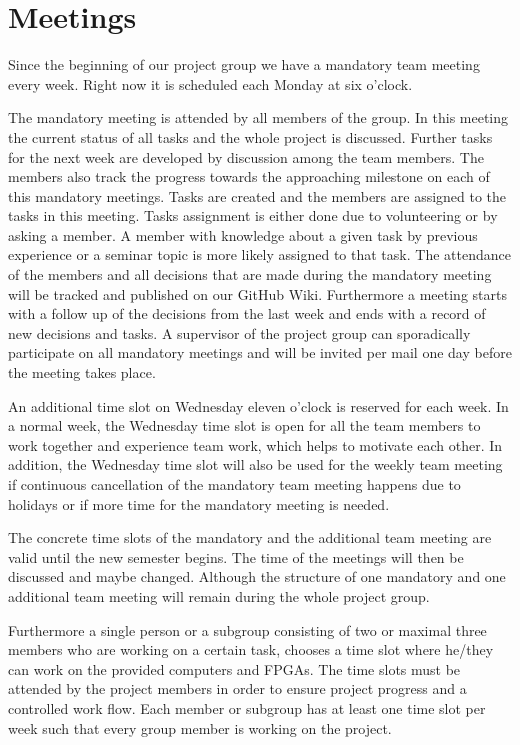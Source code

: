 \section{Meetings}
Since the beginning of our project group we have a mandatory team meeting every week.
Right now it is scheduled each Monday at six o'clock.

The mandatory meeting is attended by all members of the group.
In this meeting the current status of all tasks and the whole project is discussed.
Further tasks for the next week are developed by discussion among the team members.
The members also track the progress towards the approaching milestone on each of this mandatory meetings.
Tasks are created and the members are assigned to the tasks in this meeting. Tasks assignment is either done due to volunteering or by asking a member.
A member with knowledge about a given task by previous experience or a seminar topic is more likely assigned to that task.
The attendance of the members and all decisions that are made during the mandatory meeting will be tracked and published on our GitHub Wiki. Furthermore a meeting starts with a follow up of the decisions from the last week and ends with a record of new decisions and tasks.
A supervisor of the project group can sporadically participate on all mandatory meetings and will be invited per mail one day before the meeting takes place. 

An additional time slot on Wednesday eleven o'clock is reserved for each week.
In a normal week, the Wednesday time slot is open for all the team members to work together and experience team work, which helps to motivate each other.
In addition, the Wednesday time slot will also be used for the weekly team meeting if continuous cancellation of the mandatory team meeting happens due to holidays
or if more time for the mandatory meeting is needed.

The concrete time slots of the mandatory and the additional team meeting are valid until the new semester begins. The time of the meetings will then be discussed and maybe changed. Although the structure of one mandatory and one additional team meeting will remain during the whole project group.

Furthermore a single person or a subgroup consisting of two or maximal three members who are working on a certain task, chooses a time slot where he/they can work on the provided computers and \acp{FPGA}.
The time slots must be attended by the project members in order to ensure project progress and a controlled work flow.
Each member or subgroup has at least one time slot per week such that every group member is working on the project.

